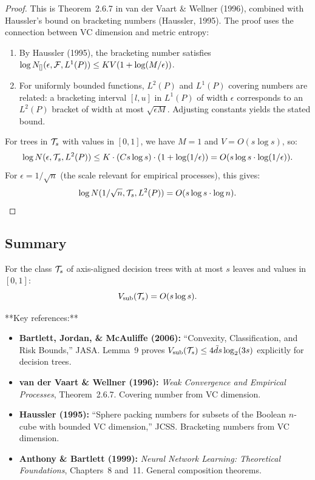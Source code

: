 \documentclass[12pt]{article}
\begin{document}
\begin{proof}
This is Theorem~2.6.7 in van der Vaart \& Wellner (1996), combined with Haussler's bound on bracketing numbers (Haussler, 1995). The proof uses the connection between VC dimension and metric entropy:
\begin{enumerate}
\item By Haussler (1995), the bracketing number satisfies $\log N_{[]}(\epsilon, \mathcal{F}, L^1(P)) \le K V (1 + \log(M/\epsilon))$.
\item For uniformly bounded functions, $L^2(P)$ and $L^1(P)$ covering numbers are related: a bracketing interval $[l, u]$ in $L^1(P)$ of width $\epsilon$ corresponds to an $L^2(P)$ bracket of width at most $\sqrt{\epsilon M}$. Adjusting constants yields the stated bound.
\end{enumerate}

For trees in $\mathcal{T}_s$ with values in $[0,1]$, we have $M = 1$ and $V = O(s \log s)$, so:
\[
\log N(\epsilon, \mathcal{T}_s, L^2(P)) \le K \cdot (Cs \log s) \cdot (1 + \log(1/\epsilon)) = O(s \log s \cdot \log(1/\epsilon)).
\]
For $\epsilon = 1/\sqrt{n}$ (the scale relevant for empirical processes), this gives:
\[
\log N(1/\sqrt{n}, \mathcal{T}_s, L^2(P)) = O(s \log s \cdot \log n).
\]
\end{proof}

\subsection{Summary}

For the class $\mathcal{T}_s$ of axis-aligned decision trees with at most $s$ leaves and values in $[0,1]$:
\[
V_{\text{sub}}(\mathcal{T}_s) = O(s \log s).
\]

**Key references:**
\begin{itemize}
\item \textbf{Bartlett, Jordan, \& McAuliffe (2006):} ``Convexity, Classification, and Risk Bounds,'' JASA. Lemma~9 proves $V_{\text{sub}}(\mathcal{T}_s) \le 4\tilde{d} s \log_2(3s)$ explicitly for decision trees.
\item \textbf{van der Vaart \& Wellner (1996):} \emph{Weak Convergence and Empirical Processes}, Theorem~2.6.7. Covering number from VC dimension.
\item \textbf{Haussler (1995):} ``Sphere packing numbers for subsets of the Boolean $n$-cube with bounded VC dimension,'' JCSS. Bracketing numbers from VC dimension.
\item \textbf{Anthony \& Bartlett (1999):} \emph{Neural Network Learning: Theoretical Foundations}, Chapters~8 and~11. General composition theorems.
\end{itemize}
\end{document}
